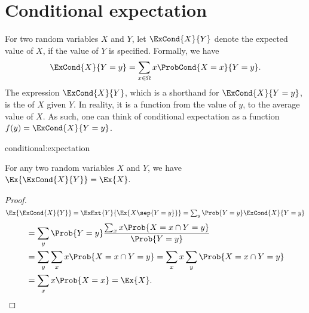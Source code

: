 
\section{Conditional expectation}

For two random variables $X$ and $Y$, let $\ExCond{X}{Y}$ denote the
expected value of $X$, if the value of $Y$ is specified. Formally, we
have
\begin{equation*}
    \ExCond{X}{Y =y}%
    =%
    \sum_{x \in \Omega} x \ProbCond{X =x}{Y=y}.
\end{equation*}
The expression $\ExCond{X}{Y}$, which is a shorthand for
$\ExCond{X}{Y=y}$, is the  of $X$ given
$Y$. In reality, it is a function from the value of $y$, to the
average value of $X$. As such, one can think of conditional
expectation as a function $f(y) = \ExCond{X}{Y=y}$.


\begin{fragment}{conditional:expectation}
\begin{lemma}%
    For any two random variables $X$ and $Y$, we have
    \begin{math}
        \Ex{ \bigl. \ExCond{X}{ Y} } = \Ex{ \bigl. X}.
    \end{math}
\end{lemma}
\end{fragment}
\begin{proof}
    \begin{math}
        \Ex{\bigl. \ExCond{X }{ Y} }%
        =%
        \ExExt{Y}{ \Ex{ X \sep{ Y = y}}} =%
        \sum_y \Prob{Y = y} \ExCond{ X}{ Y = y}%
    \end{math}
    \begin{align*}
      &=%
        \sum_y \Prob{\bigl. Y = y} \frac{\sum_{x} x \Prob{X = x \cap
        Y=y}}{\Prob{Y=y}}%
      \\ &%
           =%
           \sum_{y} \sum_{x} x \Prob{ \bigl. X =x \cap Y = y}%
           =%
           \sum_{x} x \sum_y \Prob{ \bigl. X =x \cap Y = y}%
      \\ &%
           =%
           \sum_{x} x \Prob{\bigl. X = x}%
           =%
           \Ex{\bigl. X}.
    \end{align*}
\end{proof}

